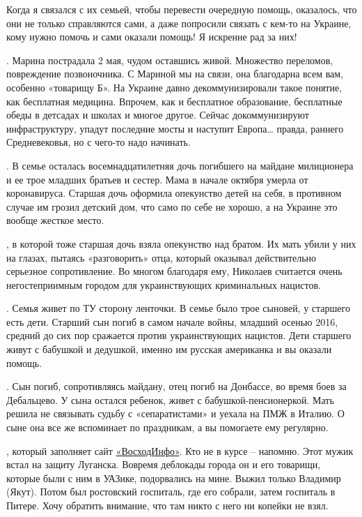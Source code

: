 Когда я связался с их семьей, чтобы перевести очередную помощь, оказалось, что
они не только справляются сами, а даже попросили связать с кем-то на Украине,
кому нужно помочь и сами оказали помощь! Я искренне рад за них!

. Марина пострадала 2
мая, чудом оставшись живой. Множество переломов, повреждение позвоночника. С
Мариной мы на связи, она благодарна всем вам, особенно «товарищу Б». На Украине
давно декоммунизировали такое понятие, как бесплатная медицина. Впрочем, как и
бесплатное образование, бесплатные обеды в детсадах и школах и многое другое.
Сейчас докоммунизируют инфраструктуру, упадут последние мосты и наступит
Европа… правда, раннего Средневековья, но с чего-то надо начинать.

. В семье осталась
восемнадцатилетняя дочь погибшего на майдане милиционера и ее трое младших
братьев и сестер. Мама в начале октября умерла от коронавируса. Старшая дочь
оформила опекунство детей на себя, в противном случае им грозил детский дом,
что само по себе не хорошо, а на Украине это вообще жесткое место.

, в которой тоже старшая дочь взяла опекунство над
братом. Их мать убили у них на глазах, пытаясь «разговорить» отца, который
оказывал действительно серьезное сопротивление. Во многом благодаря ему,
Николаев считается очень негостеприимным городом для украинствующих
криминальных нацистов.

. Семья живет по ТУ сторону
ленточки. В семье было трое сыновей, у старшего есть дети. Старший сын погиб в
самом начале войны, младший осенью 2016, средний до сих пор сражается против
украинствующих нацистов. Дети старшего живут с бабушкой и дедушкой, именно им
русская американка и вы оказали помощь.

. Сын погиб,
сопротивляясь майдану, отец погиб на Донбассе, во время боев за Дебальцево. У
сына остался ребенок, живет с бабушкой-пенсионеркой. Мать решила не связывать
судьбу с «сепаратистами» и уехала на ПМЖ в Италию. О сыне она все же вспоминает
по праздникам, а вы помогаете ему регулярно.

, который заполняет сайт
\href{https://voskhodinfo.su}{«ВосходИнфо»}. Кто не в курсе – напомню. Этот мужик встал на защиту Луганска.
Вовремя деблокады города он и его товарищи, которые были с ним в УАЗике,
подорвались на мине. Выжил только Владимир (Якут). Потом был ростовский
госпиталь, где его собрали, затем госпиталь в Питере. Хочу обратить внимание,
что там никто с него ни копейки не взял.

